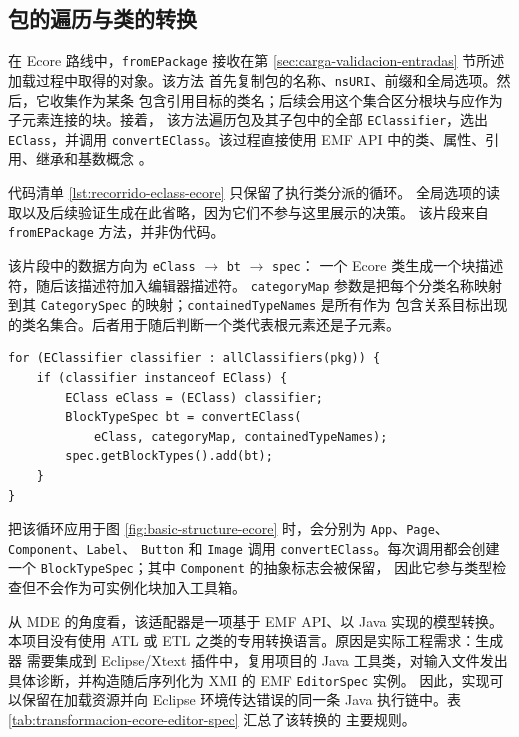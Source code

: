 \subsection{包的遍历与类的转换}

在 Ecore 路线中，\texttt{fromEPackage} 接收在第
\ref{sec:carga-validacion-entradas} 节所述加载过程中取得的对象。该方法
首先复制包的名称、\texttt{nsURI}、前缀和全局选项。然后，它收集作为某条
包含引用目标的类名；后续会用这个集合区分根块与应作为子元素连接的块。接着，
该方法遍历包及其子包中的全部 \texttt{EClassifier}，选出
\texttt{EClass}，并调用 \texttt{convertEClass}。该过程直接使用 EMF
API 中的类、属性、引用、继承和基数概念 \cite{emfOverview}。

代码清单 \ref{lst:recorrido-eclass-ecore} 只保留了执行类分派的循环。
全局选项的读取以及后续验证生成在此省略，因为它们不参与这里展示的决策。
该片段来自 \texttt{fromEPackage} 方法，并非伪代码。

该片段中的数据方向为
\texttt{eClass} $\rightarrow$ \texttt{bt} $\rightarrow$ \texttt{spec}：
一个 Ecore 类生成一个块描述符，随后该描述符加入编辑器描述符。
\texttt{categoryMap} 参数是把每个分类名称映射到其
\texttt{CategorySpec} 的映射；\texttt{containedTypeNames} 是所有作为
包含关系目标出现的类名集合。后者用于随后判断一个类代表根元素还是子元素。

\begin{lstlisting}[float=htbp, style=tfmjavaecore, captionpos=t, caption={Ecore 类的遍历与转换}, label={lst:recorrido-eclass-ecore}]
for (EClassifier classifier : allClassifiers(pkg)) {
    if (classifier instanceof EClass) {
        EClass eClass = (EClass) classifier;
        BlockTypeSpec bt = convertEClass(
            eClass, categoryMap, containedTypeNames);
        spec.getBlockTypes().add(bt);
    }
}
\end{lstlisting}
\FloatBarrier

把该循环应用于图 \ref{fig:basic-structure-ecore} 时，会分别为
\texttt{App}、\texttt{Page}、\texttt{Component}、\texttt{Label}、
\texttt{Button} 和 \texttt{Image} 调用 \texttt{convertEClass}。每次调用都会创建一个
\texttt{BlockTypeSpec}；其中 \texttt{Component} 的抽象标志会被保留，
因此它参与类型检查但不会作为可实例化块加入工具箱。

从 MDE 的角度看，该适配器是一项基于 EMF API、以 Java 实现的模型转换。
本项目没有使用 ATL 或 ETL 之类的专用转换语言。原因是实际工程需求：生成器
需要集成到 Eclipse/Xtext 插件中，复用项目的 Java 工具类，对输入文件发出
具体诊断，并构造随后序列化为 XMI 的 EMF \texttt{EditorSpec} 实例。
因此，实现可以保留在加载资源并向 Eclipse 环境传达错误的同一条 Java
执行链中。表 \ref{tab:transformacion-ecore-editor-spec} 汇总了该转换的
主要规则。

